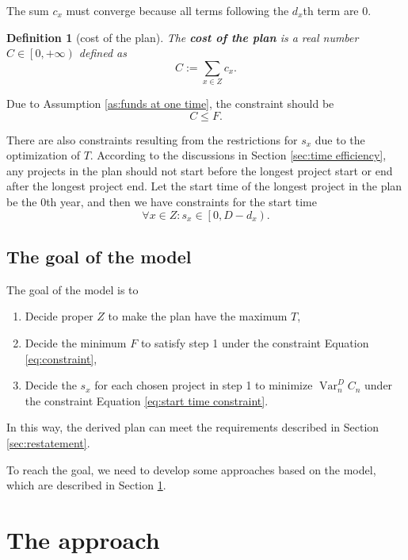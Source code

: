 \documentclass{article}
\DeclareMathOperator*{\var}{Var}
\newtheorem{definition}{Definition}
\begin{document}
The sum $c_x$ must converge because all terms following the $d_x$th term are $0$.

\begin{definition}[cost of the plan]
The \textbf{cost of the plan} is a real number $C\in\left[0,+\infty\right)$ defined as
\begin{equation}
C:=\sum_{x\in Z}c_x.
\end{equation}
\end{definition}

Due to Assumption \ref{as:funds at one time}, the constraint should be
\begin{equation}
\label{eq:constraint}
C\le F.
\end{equation}

There are also constraints resulting from the restrictions for $s_x$ due to the optimization of $T$.
According to the discussions in Section \ref{sec:time efficiency}, any projects in the plan should not start before the longest project start or end after the longest project end.
Let the start time of the longest project in the plan be the $0$th year, and then we have constraints for the start time
\begin{equation}
\label{eq:start time constraint}
\forall x\in Z:s_x\in\left[0,D-d_x\right).
\end{equation}

\subsection{The goal of the model}
\label{sec:goal}

The goal of the model is to
\begin{enumerate}
\item Decide proper $Z$ to make the plan have the maximum $T$,
\item Decide the minimum $F$ to satisfy step 1 under the constraint Equation \ref{eq:constraint},
\item Decide the $s_x$ for each chosen project in step 1 to minimize $\var_n^DC_n$ under the constraint Equation \ref{eq:start time constraint}.
\end{enumerate}

In this way, the derived plan can meet the requirements described in Section \ref{sec:restatement}.

To reach the goal, we need to develop some approaches based on the model,
which are described in Section \ref{sec:approach}.

\section{The approach}
\label{sec:approach}
\end{document}
